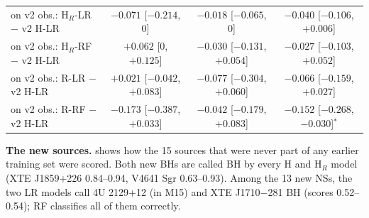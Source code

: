 \begin{table}[htbp]
\begin{tabular}{@{}lccc@{}}
on v2 obs.: H$_R$-LR $-$ v2 H-LR & $-0.071$ [$-0.214$, 0] & $-0.018$ [$-0.065$, 0] & $-0.040$ [$-0.106$, $+0.006$] \\
on v2 obs.: H$_R$-RF $-$ v2 H-LR & $+0.062$ [0, $+0.125$] & $-0.030$ [$-0.131$, $+0.054$] & $-0.027$ [$-0.103$, $+0.052$] \\
on v2 obs.: R-LR $-$ v2 H-LR & $+0.021$ [$-0.042$, $+0.083$] & $-0.077$ [$-0.304$, $+0.060$] & $-0.066$ [$-0.159$, $+0.027$] \\
on v2 obs.: R-RF $-$ v2 H-LR & $-0.173$ [$-0.387$, $+0.033$] & $-0.042$ [$-0.179$, $+0.083$] & $-0.152$ [$-0.268$, $-0.030$]$^*$ \\
\bottomrule
\end{tabular}
\end{table}

\textbf{The new sources.}  shows how the 15 sources that were never part of any earlier training set
were scored. Both new BHs are called BH by every H and H$_R$ model (XTE J1859+226 0.84--0.94, V4641 Sgr 0.63--0.93). Among
the 13 new NSs, the two LR models call 4U 2129+12 (in M15) and XTE J1710$-$281 BH (scores 0.52--0.54); RF classifies all of
them correctly.

